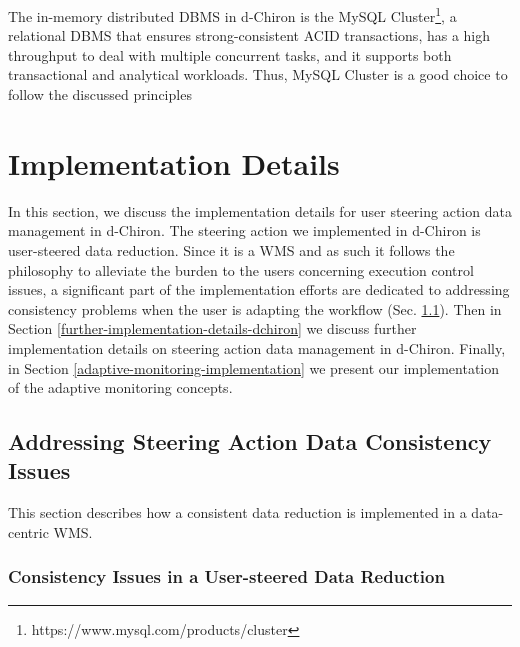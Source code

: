 The in-memory distributed DBMS in d-Chiron is the MySQL Cluster\footnote{https://www.mysql.com/products/cluster}, a relational DBMS that ensures strong-consistent ACID transactions, has a high throughput to deal with multiple concurrent tasks, and it supports both transactional and analytical workloads. Thus, MySQL Cluster is a good choice to follow the discussed principles

\section{Implementation Details}
\label{d-chiron-implentation}

In this section, we discuss the implementation details for user steering action data management in d-Chiron.
The steering action we implemented in d-Chiron is user-steered data reduction.
Since it is a WMS and as such it follows the
philosophy to alleviate the burden to the users concerning
execution control issues, a significant part of the implementation efforts are dedicated to addressing consistency problems when the
user is adapting the workflow (Sec. \ref{consistency-issues}).
Then in Section \ref{further-implementation-details-dchiron} we discuss further implementation details on steering action data management in d-Chiron. Finally, in Section \ref{adaptive-monitoring-implementation} we present our implementation of the adaptive monitoring concepts.


\subsection{Addressing Steering Action Data Consistency Issues}
\label{consistency-issues}

This section describes how a consistent data reduction is implemented in a data-centric WMS.


\subsubsection{Consistency Issues in a User-steered Data Reduction}

